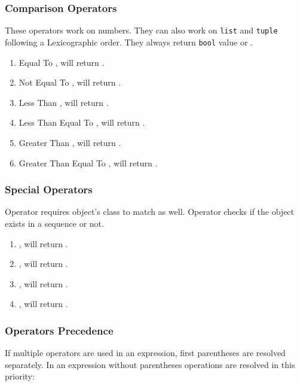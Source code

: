 \documentclass{beamer}
\newcounter{sauvegardeenumi}
\newcommand{\asuivre}{\setcounter{sauvegardeenumi}{\theenumi}}
\begin{document}
\begin{frame}[fragile]
\frametitle{Comparison Operators}
These operators work on numbers. They can also work on \lstinline{list} and \lstinline{tuple} following a Lexicographic order. They always return \lstinline{bool} value  or .
\begin{enumerate}
\item Equal To \pyth{==},  will return .
\item Not Equal To \pyth{!=},  will return .
\item Less Than \pyth{<},  will return .
\item Less Than Equal To \pyth{<=},  will return .
\item Greater Than \pyth{>},  will return .
\item Greater Than Equal To \pyth{>=},  will return .
\end{enumerate}
\end{frame}

\begin{frame}[fragile]
\frametitle{Special Operators}
Operator  requires object's class to match as well. Operator  checks if the object exists in a sequence or not.
\begin{enumerate}
\item {},  will return .
\item {},  will return .
\item {}, \pyth{0 in [0.0, 1, 2j]} will return .
\item {},  will return .
\end{enumerate}
\end{frame}

\begin{frame}[fragile]
\frametitle{Operators Precedence}
If multiple operators are used in an expression, first parentheses are resolved separately. In an expression without parentheses operations are resolved in this priority:

\end{frame}
\end{document}
